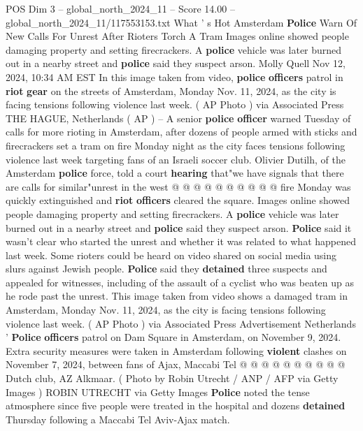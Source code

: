 \begin{textsample}{POS Dim 3 – global\_north\_2024\_11 – Score 14.00 – global\_north\_2024\_11/117553153.txt}  \label{ex:f3_pos_187}
What ' s Hot Amsterdam \textbf{Police} Warn Of New Calls For Unrest After Rioters Torch A Tram Images online showed people damaging property and setting firecrackers.
A \textbf{police} vehicle was later burned out in a nearby street and \textbf{police} said they suspect arson.
Molly Quell Nov 12, 2024, 10:34 AM EST In this image taken from video, \textbf{police} \textbf{officers} patrol in \textbf{riot} \textbf{gear} on the streets of Amsterdam, Monday Nov. 11, 2024, as the city is facing tensions following violence last week. ( AP Photo ) via Associated Press THE HAGUE, Netherlands ( AP ) -- A senior \textbf{police} \textbf{officer} warned Tuesday of calls for more rioting in Amsterdam, after dozens of people armed with sticks and firecrackers set a tram on fire Monday night as the city faces tensions following violence last week targeting fans of an Israeli soccer club.
Olivier Dutilh, of the Amsterdam \textbf{police} force, told a court \textbf{hearing} that"we have signals that there are calls for similar"unrest in the west @ @ @ @ @ @ @ @ @ @ fire Monday was quickly extinguished and \textbf{riot} \textbf{officers} cleared the square.
Images online showed people damaging property and setting firecrackers.
A \textbf{police} vehicle was later burned out in a nearby street and \textbf{police} said they suspect arson. \textbf{Police} said it wasn't clear who started the unrest and whether it was related to what happened last week.
Some rioters could be heard on video shared on social media using slurs against Jewish people. \textbf{Police} said they \textbf{detained} three suspects and appealed for witnesses, including of the assault of a cyclist who was beaten up as he rode past the unrest.
This image taken from video shows a damaged tram in Amsterdam, Monday Nov. 11, 2024, as the city is facing tensions following violence last week. ( AP Photo ) via Associated Press Advertisement Netherlands ' \textbf{Police} \textbf{officers} patrol on Dam Square in Amsterdam, on November 9, 2024.
Extra security measures were taken in Amsterdam following \textbf{violent} clashes on November 7, 2024, between fans of Ajax, Maccabi Tel @ @ @ @ @ @ @ @ @ @ Dutch club, AZ Alkmaar. ( Photo by Robin Utrecht / ANP / AFP via Getty Images ) ROBIN UTRECHT via Getty Images \textbf{Police} noted the tense atmosphere since five people were treated in the hospital and dozens \textbf{detained} Thursday following a Maccabi Tel Aviv-Ajax match.

\end{textsample}
